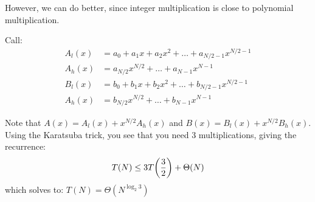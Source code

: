 However, we can do better, since integer multiplication is close to polynomial multiplication.

\begin{algothm} 
    Call:
    \begin{align*}
        A_l(x) &= a_0 + a_1 x + a_2 x^2 + \dots + a_{N/2 - 1}x^{N/2 - 1} \\
        A_h(x) &= a_{N/2} x^{N/2} + \dots + a_{N-1}x^{N - 1} \\
        B_l(x) &= b_0 + b_1 x + b_2 x^2 + \dots + b_{N/2 - 1}x^{N/2 - 1} \\
        A_h(x) &= b_{N/2} x^{N/2} + \dots + b_{N-1}x^{N - 1} 
    \end{align*}

    Note that $A(x) = A_l(x) + x^{N/2} A_h(x)$ and $B(x) = B_l(x) +  x^{N/2} B_h(x)$. Using the Karatsuba trick,
    you see that you need 3 multiplications, giving the recurrence:
    \[ T(N) \leq 3 T\qty(\frac{3}{2}) + \Theta(N) \]
    which solves to: $T(N) = \Theta(N^{\log_2{3}})$

\end{algothm}

